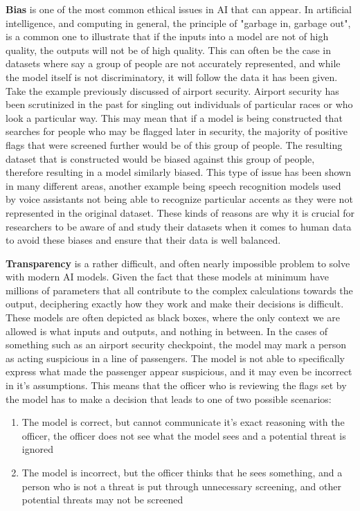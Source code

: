 
\textbf{Bias} is one of the most common ethical issues in AI that can appear. In artificial intelligence, and computing in general, the principle of "garbage in, garbage out", is a common one to illustrate that if the inputs into a model are not of high quality, the outputs will not be of high quality. This can often be the case in datasets where say a group of people are not accurately represented, and while the model itself is not discriminatory, it will follow the data it has been given. Take the example previously discussed of airport security. Airport security has been scrutinized in the past for singling out individuals of particular races or who look a particular way. This may mean that if a model is being constructed that searches for people who may be flagged later in security, the majority of positive flags that were screened further would be of this group of people. The resulting dataset that is constructed would be biased against this group of people, therefore resulting in a model similarly biased. This type of issue has been shown in many different areas, another example being speech recognition models used by voice assistants not being able to recognize particular accents as they were not represented in the original dataset. These kinds of reasons are why it is crucial for researchers to be aware of and study their datasets when it comes to human data to avoid these biases and ensure that their data is well balanced.

\textbf{Transparency} is a rather difficult, and often nearly impossible problem to solve with modern AI models. Given the fact that these models at minimum have millions of parameters that all contribute to the complex calculations towards the output, deciphering exactly how they work and make their decisions is difficult. These models are often depicted as black boxes, where the only context we are allowed is what inputs and outputs, and nothing in between. In the cases of something such as an airport security checkpoint, the model may mark a person as acting suspicious in a line of passengers. The model is not able to specifically express what made the passenger appear suspicious, and it may even be incorrect in it's assumptions. This means that the officer who is reviewing the flags set by the model has to make a decision that leads to one of two possible scenarios:

\begin{enumerate}
	\item The model is correct, but cannot communicate it's exact reasoning with the officer, the officer does not see what the model sees and a potential threat is ignored
	\item The model is incorrect, but the officer thinks that he sees something, and a person who is not a threat is put through unnecessary screening, and other potential threats may not be screened
\end{enumerate}

